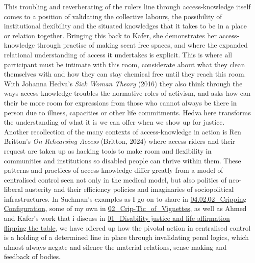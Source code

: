 This troubling and reverberating of the rulers line through
access-knowledge itself comes to a position of validating the collective
labours, the possibility of institutional flexibility and the situated
knowledges that it takes to be in a place or relation together. Bringing
this back to Kafer, she demonstrates her access-knowledge through
practise of making scent free spaces, and where the expanded relational
understanding of access it undertakes is explicit. This is where all
participant must be intimate with this room, considerate about what they
clean themselves with and how they can stay chemical free until they
reach this room. With Johanna Hedva's \emph{Sick Woman Theory} (2016)
they also think through the ways access-knowledge troubles the normative
roles of activism, and asks how can their be more room for expressions
from those who cannot always be there in person due to illness,
capacities or other life commitments. Hedva here transforms the
understanding of what it is we can offer when we show up for justice.
Another recollection of the many contexts of access-knowledge in action
is Ren Britton's \emph{On Rehearsing Access} (Britton, 2024) where
access riders and their request are taken up as hacking tools to make
room and flexibility in communities and institutions so disabled people
can thrive within them. These patterns and practices of access knowledge
differ greatly from a model of centralised control seen not only in the
medical model, but also politics of neo-liberal austerity and their
efficiency policies and imaginaries of sociopolitical infrastructures.
In Suchman's examples as I go on to share in
\href{04.02.02_Cripping\%20Configuration.md}{04.02.02\_Cripping
Configuration}, some of my own in
\href{../../02_Crip-Tic_of_Vignettes/02_Crip-Tic_of_Vignettes.md}{02\_Crip-Tic\_of\_Vignettes},
as well as Ahmed and Kafer's work that i discuss in
\href{../../01_Disability_justice_and_life_affirmation_flipping_the_table/01_Disability\%20justice\%20and\%20life\%20affirmation\%20flipping\%20the\%20table.md}{01\_Disability
justice and life affirmation flipping the table}, we have offered up how
the pivotal action in centralised control is a holding of a determined
line in place through invalidating penal logics, which almost always
negate and silence the material relations, sense making and feedback of
bodies.

